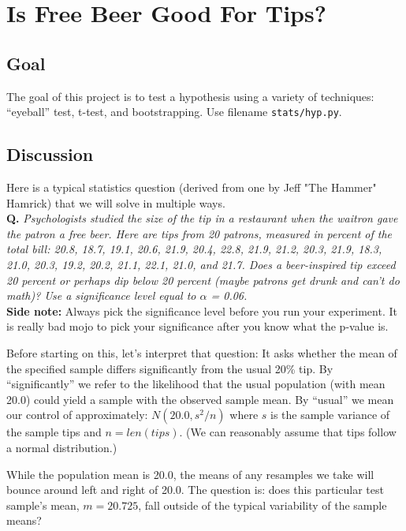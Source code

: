 \documentclass[titlepage]{tufte-book}
\newcounter{problem}
\newcounter{total}
\begin{document}
\chapter{Is Free Beer Good For Tips?}

\setcounter{problem}{1}
\section{Goal}

\begin{fullwidth}

The goal of this project is to test a hypothesis using a variety of techniques: ``eyeball'' test, t-test, and bootstrapping. Use filename {\tt stats/hyp.py}. 

\section{Discussion}

Here is a typical statistics question (derived from one by Jeff "The Hammer" Hamrick) that we will solve in multiple ways.\\

{\bf Q.} {\em Psychologists studied the size of the tip in a restaurant when the waitron gave the patron a free beer. Here are tips from 20 patrons, measured in percent of the total bill: 20.8, 18.7, 19.1, 20.6, 21.9, 20.4, 22.8,
        21.9, 21.2, 20.3, 21.9, 18.3, 21.0, 20.3,
        19.2, 20.2, 21.1, 22.1, 21.0, and 21.7. Does a beer-inspired tip exceed 20 percent or perhaps dip below 20 percent (maybe patrons get drunk and can't do math)? Use a significance level equal to $\alpha$ = 0.06.}\\
        
{\bf Side note:} Always pick the significance level before you run your experiment. It is really bad mojo to pick your significance after you know what the p-value is.

Before starting on this, let's interpret that question: It asks whether the mean of the specified sample differs significantly from the usual 20\% tip. By ``significantly'' we refer to the likelihood that the usual population (with mean 20.0) could yield a sample with the observed sample mean. By ``usual'' we mean our control of approximately: $N(20.0, s^2/n)$ where $s$ is the sample variance of the sample tips and $n=len(tips)$. (We can reasonably assume  that tips follow a normal distribution.)

While the population mean is 20.0, the means of any resamples we take will bounce around left and right of 20.0.  The question is: does this particular test sample's mean, $m=20.725$, fall outside of the typical variability of the sample means?


\end{fullwidth}
\end{document}
